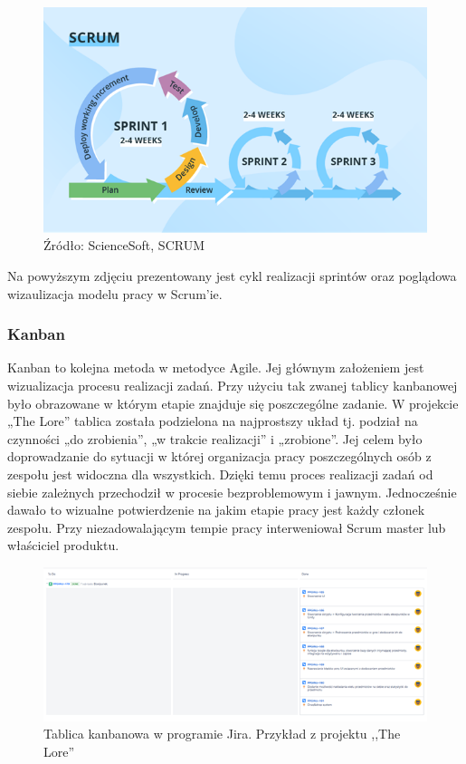 \documentclass[oneside,polski,logo]{amuthesis}
\begin{document}
\begin{figure}[h]
	\centering
	\includegraphics[width=13cm]{images/hyps/scrum.png}
	\caption{Źródło: ScienceSoft, SCRUM}
\end{figure}

Na powyższym zdjęciu prezentowany jest cykl realizacji sprintów oraz poglądowa wizaulizacja modelu pracy w Scrum'ie. \\ 

\subsubsection{Kanban}
Kanban to kolejna metoda w metodyce Agile. Jej głównym założeniem jest wizualizacja procesu realizacji zadań. Przy użyciu tak zwanej tablicy kanbanowej było obrazowane w którym etapie znajduje się poszczególne zadanie. W projekcie „The Lore” tablica została podzielona na najprostszy układ tj. podział na czynności „do zrobienia”, „w trakcie realizacji” i  „zrobione”. Jej celem było doprowadzanie do sytuacji w której organizacja pracy poszczególnych osób z zespołu jest widoczna dla wszystkich. Dzięki temu proces realizacji zadań od siebie zależnych przechodził w procesie bezproblemowym i jawnym. Jednocześnie dawało to wizualne potwierdzenie na jakim etapie pracy jest każdy członek zespołu. Przy niezadowalającym tempie pracy interweniował Scrum master lub właściciel produktu.\cite{kanban}\\


\begin{figure}[h]
	\centering
	\includegraphics[width=15cm]{images/hyps/jira.png}
	\caption{Tablica kanbanowa w programie Jira. Przykład z projektu ,,The Lore''}
\end{figure}
\end{document}
